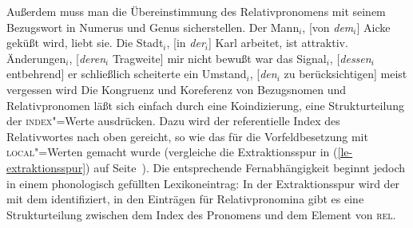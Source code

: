 Außerdem muss man die Übereinstimmung des Relativpronomens mit seinem Bezugswort in Numerus und Genus sicherstellen.
\eal
\ex Der Mann$_i$, [von \emph{dem}$_i$] Aicke geküßt wird, liebt sie.
\ex Die Stadt$_i$, [in \emph{der}$_i$] Karl arbeitet, ist attraktiv.
\ex Änderungen$_i$, [\emph{deren}$_i$ Tragweite] mir nicht bewußt war
\ex das Signal$_i$, [\emph{dessen}$_i$ entbehrend] er schließlich scheiterte
\ex ein Umstand$_i$, [\emph{den}$_i$ zu berücksichtigen] meist vergessen wird
\zl
Die Kongruenz und Koreferenz von Bezugsnomen und Relativpronomen läßt sich einfach durch eine Koindizierung, 
eine Strukturteilung der \textsc{index}"=Werte ausdrücken. Dazu wird der referentielle Index
des Relativwortes nach oben gereicht, so wie das für die Vorfeldbesetzung mit
\textsc{local}"=Werten gemacht wurde (vergleiche die Extraktionsspur in (\ref{le-extraktionsspur}) auf Seite~\pageref{le-extraktionsspur}).
Die entsprechende Fernabhängigkeit beginnt jedoch in einem phonologisch gefüllten Lexikoneintrag:
\ea{}
\z
In der Extraktionsspur wird der \localw mit dem \slashel identifiziert,
in den Einträgen für Relativpronomina gibt es eine Strukturteilung zwischen dem Index des Pronomens
und dem Element von \textsc{rel}.

